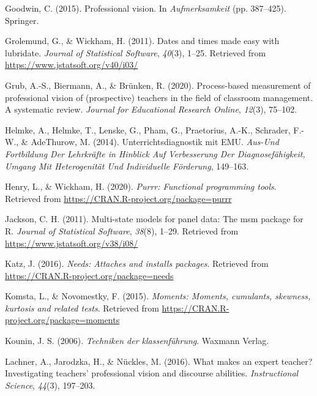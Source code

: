 \documentclass[
  man,floatsintext]{apa6}
\newlength{\cslhangindent}
\newlength{\cslentryspacingunit} %
\newenvironment{CSLReferences}[2] %
 {%
  \setlength{\parindent}{0pt}
  \ifodd #1
  \let\oldpar\par
  \def\par{\hangindent=\cslhangindent\oldpar}
  \fi
  \setlength{\parskip}{#2\cslentryspacingunit}
 }%
 {}
\begin{document}
\begin{CSLReferences}{1}{0}
\leavevmode{}%
Goodwin, C. (2015). Professional vision. In \emph{Aufmerksamkeit} (pp. 387--425). Springer.

\leavevmode{}%
Grolemund, G., \& Wickham, H. (2011). Dates and times made easy with {lubridate}. \emph{Journal of Statistical Software}, \emph{40}(3), 1--25. Retrieved from \url{https://www.jstatsoft.org/v40/i03/}

\leavevmode{}%
Grub, A.-S., Biermann, A., \& Brünken, R. (2020). Process-based measurement of professional vision of (prospective) teachers in the field of classroom management. A systematic review. \emph{Journal for Educational Research Online}, \emph{12}(3), 75--102.

\leavevmode{}%
Helmke, A., Helmke, T., Lenske, G., Pham, G., Praetorius, A.-K., Schrader, F.-W., \& AdeThurow, M. (2014). Unterrichtsdiagnostik mit EMU. \emph{Aus-Und Fortbildung Der Lehrkr{ä}fte in Hinblick Auf Verbesserung Der Diagnosef{ä}higkeit, Umgang Mit Heterogenit{ä}t Und Individuelle F{ö}rderung}, 149--163.

\leavevmode{}%
Henry, L., \& Wickham, H. (2020). \emph{Purrr: Functional programming tools}. Retrieved from \url{https://CRAN.R-project.org/package=purrr}

\leavevmode{}%
Jackson, C. H. (2011). Multi-state models for panel data: The {msm} package for {R}. \emph{Journal of Statistical Software}, \emph{38}(8), 1--29. Retrieved from \url{https://www.jstatsoft.org/v38/i08/}

\leavevmode{}%
Katz, J. (2016). \emph{Needs: Attaches and installs packages}. Retrieved from \url{https://CRAN.R-project.org/package=needs}

\leavevmode{}%
Komsta, L., \& Novomestky, F. (2015). \emph{Moments: Moments, cumulants, skewness, kurtosis and related tests}. Retrieved from \url{https://CRAN.R-project.org/package=moments}

\leavevmode{}%
Kounin, J. S. (2006). \emph{Techniken der klassenf{ü}hrung}. Waxmann Verlag.

\leavevmode{}%
Lachner, A., Jarodzka, H., \& Nückles, M. (2016). What makes an expert teacher? Investigating teachers' professional vision and discourse abilities. \emph{Instructional Science}, \emph{44}(3), 197--203.


\end{CSLReferences}
\end{document}
